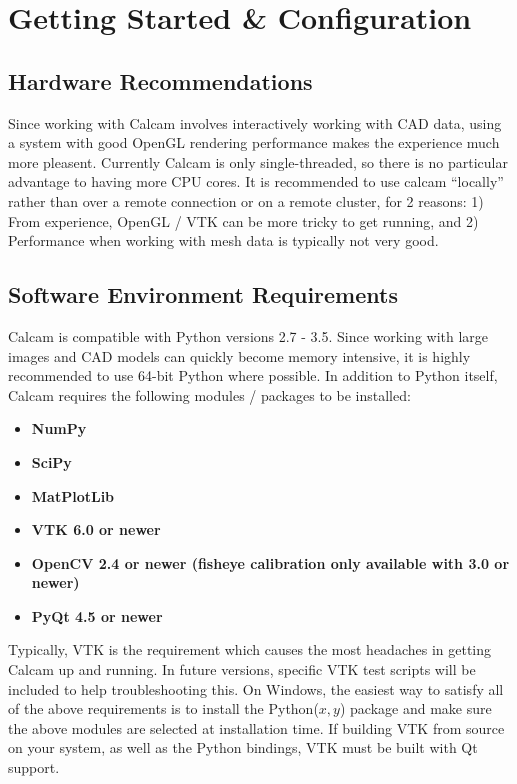 \documentclass[12pt]{article}
\begin{document}
\section{Getting Started \& Configuration}

\subsection{Hardware Recommendations}
Since working with Calcam involves interactively working with CAD data, using a system with good OpenGL rendering performance makes the experience much more pleasent. Currently Calcam is only single-threaded, so there is no particular advantage to having more CPU cores. It is recommended to use calcam ``locally'' rather than over a remote connection or on a remote cluster, for 2 reasons: 1) From experience, OpenGL / VTK can be more tricky to get running, and 2) Performance when working with mesh data is typically not very good.

\subsection{Software Environment Requirements}

Calcam is compatible with Python versions 2.7 - 3.5. Since working with large images and CAD models can quickly become memory intensive, it is highly recommended to use 64-bit Python where possible. In addition to Python itself, Calcam requires the following modules / packages to be installed:

\begin{itemize}
\item \textbf{NumPy}
\item \textbf{SciPy}
\item \textbf{MatPlotLib}
\item \textbf{VTK 6.0 or newer}
\item \textbf{OpenCV 2.4 or newer (fisheye calibration only available with 3.0 or newer)}
\item \textbf{PyQt 4.5 or newer}
\end{itemize}

Typically, VTK is the requirement which causes the most headaches in getting Calcam up and running. In future versions, specific VTK test scripts will be included to help troubleshooting this. On Windows, the easiest way to satisfy all of the above requirements is to install the Python($x,y$) package and make sure the above modules are selected at installation time. If building VTK from source on your system, as well as the Python bindings, VTK must be built with Qt support. 
\end{document}
